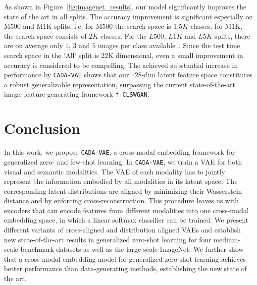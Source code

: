 \documentclass[10pt,twocolumn,letterpaper]{article}
\begin{document}
As shown in Figure~\ref{fig:imagenet_results}, our model significantly improves the state of the art in all splits. The accuracy improvement is significant especially on M500 and M1K splits, i.e. for M500 the search space is $1.5K$ classes, for M1K, the search space consists of $2K$ classes. For the $L500$, $L1K$ and $L5K$ splits, there are on average only $1$, $3$ and $5$ images per class available~\cite{goodbadugly}. Since the test time search space in the `All` split is $22\mathrm{K}$ dimensional, even a small improvement in accuracy is considered to be compelling. The achieved substantial increase in performance by \texttt{CADA-VAE} shows that our $128$-dim latent feature space constitutes a robust generalizable representation, surpassing the current state-of-the-art image feature generating framework \texttt{f-CLSWGAN}.


\section{Conclusion}
\label{sec:con}

In this work, we propose \texttt{CADA-VAE}, a cross-modal embedding framework for generalized zero- and few-shot learning. In \texttt{CADA-VAE}, we train a VAE for both visual and semantic modalities. The VAE of each modality has to jointly represent the information embodied by all modalities in its latent space. The corresponding latent distributions are aligned by minimizing their Wasserstein distance and by enforcing cross-reconstruction. This procedure leaves us with encoders that can encode features from different modalities into one cross-modal embedding space, in which a linear softmax classifier can be trained.
We present different variants of cross-aligned and distribution aligned VAEs and establish new state-of-the-art results in generalized zero-shot learning for four medium-scale benchmark datasets as well as the large-scale ImageNet. We further show that a cross-modal embedding model for generalized zero-shot learning achieves better performance than data-generating methods, establishing the new state of the art.

{\small


}
\end{document}
